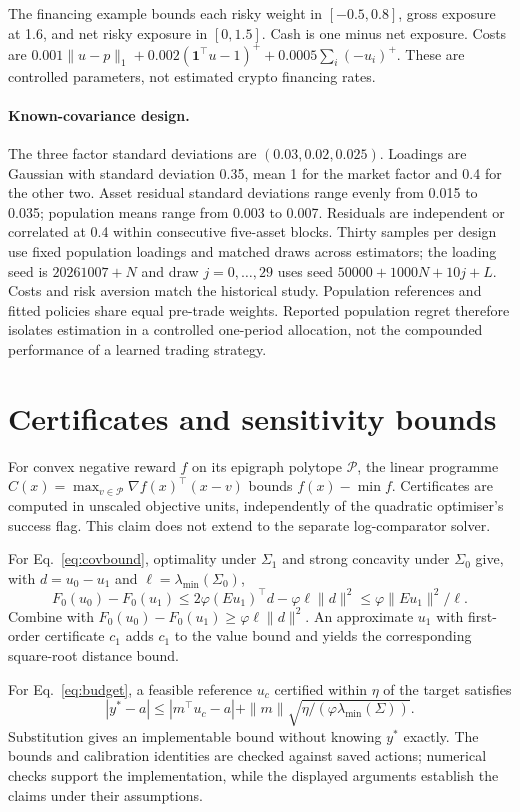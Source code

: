 \documentclass[sigconf,anonymous,review]{acmart}
\begin{document}
The financing example bounds each risky weight in $[-0.5,0.8]$, gross exposure at 1.6, and net risky exposure in $[0,1.5]$. Cash is one minus net exposure. Costs are $0.001\|u-p\|_1+0.002(\mathbf1^\top u-1)^++0.0005\sum_i(-u_i)^+$. These are controlled parameters, not estimated crypto financing rates.


\paragraph{Known-covariance design.}
The three factor standard deviations are $(0.03,0.02,0.025)$. Loadings are Gaussian with standard deviation 0.35, mean 1 for the market factor and 0.4 for the other two. Asset residual standard deviations range evenly from 0.015 to 0.035; population means range from 0.003 to 0.007. Residuals are independent or correlated at 0.4 within consecutive five-asset blocks. Thirty samples per design use fixed population loadings and matched draws across estimators; the loading seed is $20261007+N$ and draw $j=0,\ldots,29$ uses seed $50000+1000N+10j+L$. Costs and risk aversion match the historical study. Population references and fitted policies share equal pre-trade weights. Reported population regret therefore isolates estimation in a controlled one-period allocation, not the compounded performance of a learned trading strategy.

\section{Certificates and sensitivity bounds}\label{app:bounds}
For convex negative reward $f$ on its epigraph polytope $\mathcal P$, the linear programme $C(x)=\max_{v\in\mathcal P}\nabla f(x)^\top(x-v)$ bounds $f(x)-\min f$. Certificates are computed in unscaled objective units, independently of the quadratic optimiser's success flag. This claim does not extend to the separate log-comparator solver.

For Eq.\ \eqref{eq:covbound}, optimality under $\Sigma_1$ and strong concavity under $\Sigma_0$ give, with $d=u_0-u_1$ and $\ell=\lambda_{\min}(\Sigma_0)$,
\[
F_0(u_0)-F_0(u_1)\le2\varphi(Eu_1)^\top d-\varphi\ell\|d\|^2
\le\varphi\|Eu_1\|^2/\ell.
\]
Combine with $F_0(u_0)-F_0(u_1)\ge\varphi\ell\|d\|^2$. An approximate $u_1$ with first-order certificate $c_1$ adds $c_1$ to the value bound and yields the corresponding square-root distance bound.

For Eq.\ \eqref{eq:budget}, a feasible reference $u_c$ certified within $\eta$ of the target satisfies
\[
|y^*-a|\le |m^\top u_c-a|+
\|m\|\sqrt{\eta/(\varphi\lambda_{\min}(\Sigma))}.
\]
Substitution gives an implementable bound without knowing $y^*$ exactly. The bounds and calibration identities are checked against saved actions; numerical checks support the implementation, while the displayed arguments establish the claims under their assumptions.
\end{document}
